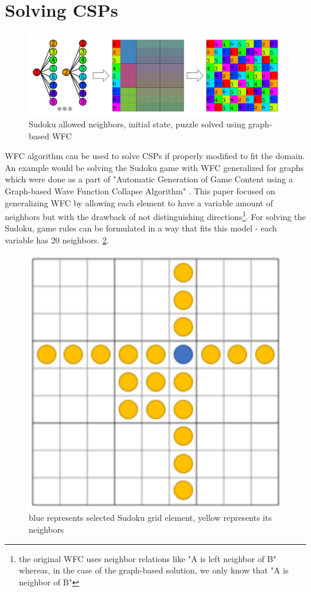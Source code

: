 \documentclass[shortabstract, english, inz]{iithesis}
\begin{document}
\section{Solving CSPs}
\begin{figure}[H]
\centering
\includegraphics[width=1\textwidth, angle=0]{images/sudoku_solver.png}
\caption{Sudoku allowed neighbors, initial state, puzzle solved using graph-based WFC \cite{GraphBased}}
\label{fig:sudoku_solver}
\end{figure}
WFC algorithm can be used to solve CSPs if properly modified to fit the domain. An example would be solving the Sudoku game with WFC generalized for graphs which were done as a part of "Automatic Generation of Game Content using a Graph-based Wave Function Collapse Algorithm" \cite{GraphBased}. This paper focused on generalizing WFC by allowing each element to have a variable amount of neighbors but with the drawback of not distinguishing directions\footnote{the original WFC uses neighbor relations like "A is left neighbor of B" whereas, in the  case of the graph-based solution, we only know that "A is neighbor of B"}. For solving the Sudoku, game rules can be formulated in a way that fits this model - each variable has 20 neighbors. \ref{fig:sudoku_neighbors}.
\begin{figure}[H]
\centering
\includegraphics[width=1\textwidth, angle=0]{images/sudoku_neighbors.png}
\caption{blue represents selected Sudoku grid element, yellow represents its neighbors \cite{GraphBased}}
\label{fig:sudoku_neighbors}
\end{figure}
\end{document}
